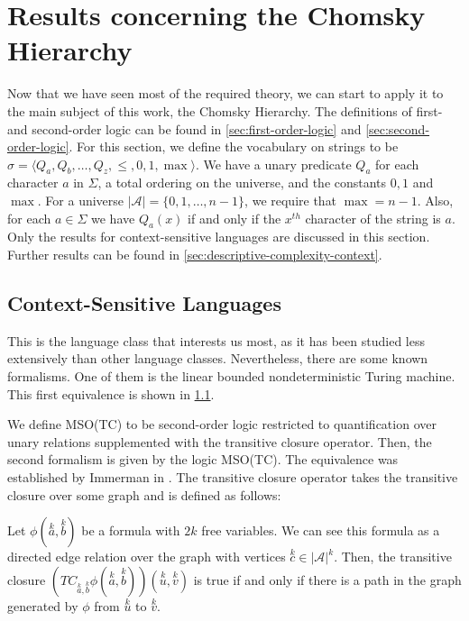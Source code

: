 \section{Results concerning the Chomsky Hierarchy}\label{sec:results-concerning-the-chomsky-hierarchy}


Now that we have seen most of the required theory, we can start to apply it to the main subject of this work, the Chomsky Hierarchy.
The definitions of first- and second-order logic can be found in \cref{sec:first-order-logic} and \cref{sec:second-order-logic}.
For this section, we define the vocabulary on strings to be $\sigma = \langle Q_a, Q_b, \dots, Q_z, \leq , 0, 1, \max \rangle$.
We have a unary predicate $Q_a$ for each character $a$ in $\Sigma$, a total ordering on the universe, and the constants $0, 1$ and $\max$.
For a universe $| \mathcal{A} | = \{0, 1, \dots, n - 1\}$, we require that $\max = n - 1$.
Also, for each $a \in \Sigma$ we have $Q_a(x)$ if and only if the $x^{th}$ character of the string is $a$.
Only the results for context-sensitive languages are discussed in this section.
Further results can be found in \cref{sec:descriptive-complexity-context}.

\subsection{Context-Sensitive Languages}\label{subsec:des-context-sensitive-languages}

This is the language class that interests us most, as it has been studied less extensively than other language classes.
Nevertheless, there are some known formalisms.
One of them is the linear bounded nondeterministic Turing machine.
This first equivalence is shown in \cref{subsec:des-context-sensitive-languages}.

We define MSO(TC) to be second-order logic restricted to quantification over unary relations supplemented with the transitive closure operator.
Then, the second formalism is given by the logic MSO(TC).
The equivalence was established by Immerman in \cite{Immerman1987}.
The transitive closure operator takes the transitive closure over some graph and is defined as follows:

\begin{define}
    Let $\phi\left(\overset{k}{a}, \overset{k}{b}\right)$ be a formula with $2k$ free variables.
    We can see this formula as a directed edge relation over the graph with vertices $\overset{k}{c} \in | \mathcal{A} |^{k}$.
    Then, the transitive closure $\left(TC_{\overset{k}{a}, \overset{k}{b}}\phi\left(\overset{k}{a}, \overset{k}{b}\right)\right)\left(\overset{k}{u}, \overset{k}{v}\right)$ is true if and only if there is a path in the graph generated by $\phi$ from $\overset{k}{u}$ to $\overset{k}{v}$.
\end{define}

